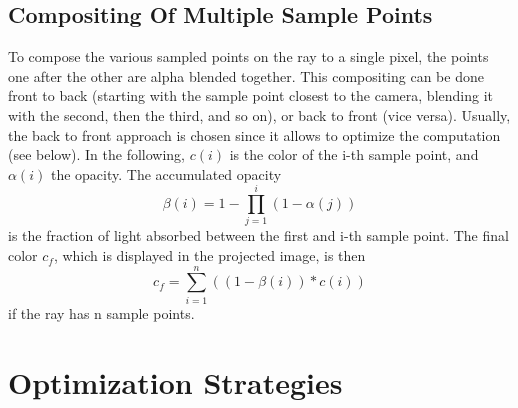 \subsection{Compositing Of Multiple Sample Points}
To compose the various sampled points on the ray to a single pixel, the points one after the other are alpha blended together. This compositing can be done front to back\cite{Sabella1988ARA, Upson1988VbufferVV } (starting with the sample point closest to the camera, blending it with the second, then the third, and so on), or back to front\cite{10.1145/378456.378484, 511} (vice versa).  Usually, the back to front approach is chosen since it allows to optimize the computation\cite{10.1145/78964.78965} (see below).
 In the following, $c(i)$ is the color of the i-th sample point, and $\alpha(i)$ the opacity. The accumulated opacity 
 \begin{equation}
 \beta(i) = 1 - \prod_{j=1}^{i}(1 - \alpha(j))
 \end{equation}
 is the fraction of light absorbed between the first and i-th sample point. The final color $c_f$, which is displayed in the projected image, is then
 \begin{equation}
 c_f = \sum_{i=1}^n((1-\beta(i)) * c(i))
 \end{equation}
 if the ray has n sample points\cite{10.1145/147130.147155}.
\section{Optimization Strategies}
